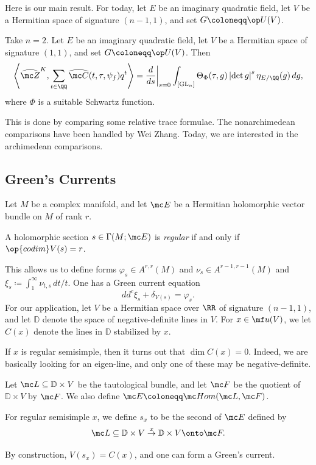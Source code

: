 \documentclass{article}
\begin{document}
Here is our main result. For today, let $E$ be an imaginary quadratic field, let $V$ be a Hermitian space of signature $(n-1,1)$, and set $G\coloneqq\op U(V)$.
\begin{theorem}
	Take $n=2$. Let $E$ be an imaginary quadratic field, let $V$ be a Hermitian space of signature $(1,1)$, and set $G\coloneqq\op U(V)$. Then
	\[\left\langle\widehat{\mc Z}^K,\sum_{t\in\QQ}\widehat{\mc C}(t,\tau,\psi_f)q^t\right\rangle=\frac d{ds}\bigg|_{s=0}\int_{[\mathrm{GL}_n]}\Theta_\Phi(\tau,g)\left|\det g\right|^s\eta_{E/\QQ}(g)\,dg,\]
	where $\Phi$ is a suitable Schwartz function.
\end{theorem}
This is done by comparing some relative trace formulae. The nonarchimedean comparisons have been handled by Wei Zhang. Today, we are interested in the archimedean comparisons.

\subsection{Green's Currents}
Let $M$ be a complex manifold, and let $\mc E$ be a Hermitian holomorphic vector bundle on $M$ of rank $r$.
\begin{definition}
	A holomorphic section $s\in\Gamma(M;\mc E)$ is \textit{regular} if and only if $\op{codim}V(s)=r$.
\end{definition}
This allows us to define forms $\varphi_s\in A^{r,r}(M)$ and $\nu_s\in A^{r-1,r-1}(M)$ and $\xi_s\coloneqq\int_1^\infty\nu_{t,s}\,dt/t$. One has a Green current equation
\[dd^c\xi_s+\delta_{V(s)}=\varphi_s.\]
For our application, let $V$ be a Hermitian space over $\RR$ of signature $(n-1,1)$, and let $\mathbb D$ denote the space of negative-definite lines in $V$. For $x\in\mf u(V)$, we let $C(x)$ denote the lines in $\mathbb D$ stabilized by $x$.
\begin{remark}
	If $x$ is regular semisimple, then it turns out that $\dim C(x)=0$. Indeed, we are basically looking for an eigen-line, and only one of these may be negative-definite.
\end{remark}
\begin{notation}
	Let $\mc L\subseteq\mathbb D\times V$ be the tautological bundle, and let $\mc F$ be the quotient of $\mathbb D\times V$ by $\mc F$. We also define $\mc E\coloneqq\mc Hom(\mc L,\mc F)$.
\end{notation}
\begin{notation}
	For regular semisimple $x$, we define $s_x$ to be the second of $\mc E$ defined by
	\[\mc L\subseteq\mathbb D\times V\stackrel x\to\mathbb D\times V\onto\mc F.\]
\end{notation}
By construction, $V(s_x)=C(x)$, and one can form a Green's current.
\end{document}
